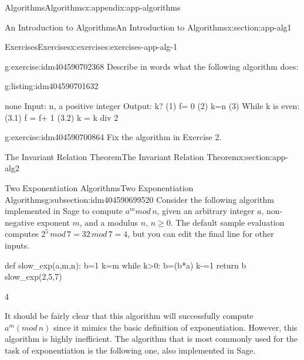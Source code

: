 \documentclass[twoside,10pt,]{book}
\numberwithin{equation}{section}
\begin{document}
\begin{appendixptx}{Algorithms}{}{Algorithms}{}{}{x:appendix:app-algorithms}
\begin{sectionptx}{An Introduction to Algorithms}{}{An Introduction to Algorithms}{}{}{x:section:app-alg1}
\begin{exercises-subsection}{Exercises}{}{Exercises}{}{}{x:exercises:exercises-app-alg-1}
\begin{divisionexercise}{5}{}{}{g:exercise:idm404590702368}%
Describe in words what the following algorithm does:%
\begin{listingptx}{}{g:listing:idm404590701632}{}%
\begin{program}{none}
Input: n, a positive integer
Output: k?
(1) f= 0
(2) k=n
(3) While k is even:
	(3.1) f = f+ 1
	(3.2) k = k div 2
\end{program}
\tcblower
\end{listingptx}%
\end{divisionexercise}%
\begin{divisionexercise}{6}{}{}{g:exercise:idm404590700864}%
Fix the algorithm in Exercise 2.%
\end{divisionexercise}%
\end{exercises-subsection}
\end{sectionptx}
%
%
\typeout{************************************************}
\typeout{************************************************}
%
\begin{sectionptx}{The Invariant Relation Theorem}{}{The Invariant Relation Theorem}{}{}{x:section:app-alg2}
%
%
\typeout{************************************************}
\typeout{************************************************}
%
\begin{subsectionptx}{Two Exponentiation Algorithms}{}{Two Exponentiation Algorithms}{}{}{g:subsection:idm404590699520}
Consider the following algorithm implemented in Sage to compute \(a^m mod \, n\), given an arbitrary integer \(a\), non-negative exponent \(m\), and a modulus \(n\), \(n \ge 0\).  The default sample evaluation computes \(2^5\, mod\,7 = 32\,mod\,7 = 4\), but you can edit the final line for other inputs.%
\begin{sageinput}
def slow_exp(a,m,n):
    b=1
    k=m
    while k>0:
        b=(b*a)%
        k-=1
    return b
slow_exp(2,5,7)
\end{sageinput}
\begin{sageoutput}
4
\end{sageoutput}
It should be fairly clear that this algorithm will successfully compute \(a^m (mod\, n)\) since it mimics the basic definition of exponentiation.  However, this algorithm is highly inefficient.  The algorithm that is most commonly used for the task of exponentiation is the following one, also implemented in Sage.%

\end{subsectionptx}
\end{sectionptx}
\end{appendixptx}
\end{document}
